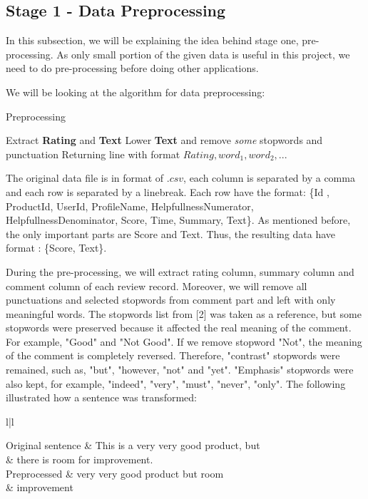 \subsection{Stage 1 - Data Preprocessing}
In this subsection, we will be explaining the idea behind stage one, pre-processing. As only small portion of the given data is useful in this project, we need to do pre-processing before doing other applications.

We will be looking at the algorithm for data preprocessing: 

\begin{algorithm}
\caption{Preprocessing}
\DontPrintSemicolon
{}

 {
 	Extract \textbf{Rating} and \textbf{Text}\;
 	Lower \textbf{Text} and remove \emph{some} stopwords and punctuation\;
 	Returning line with format \(Rating, word_{1}, word_{2}, ...\)\;
 }
\end{algorithm}


The original data file is in format of \(.csv\), each column is separated by a comma and each row is separated by a linebreak. Each row have the format: \{Id , ProductId, UserId, ProfileName, HelpfullnessNumerator, HelpfullnessDenominator, Score, Time, Summary, Text\}. As mentioned before, the only important parts are Score and Text. Thus, the resulting data have format : \{Score, Text\}. 

During the pre-processing, we will extract rating column, summary column and comment column of each review record. Moreover, we will remove all punctuations and selected stopwords from comment part and left with only meaningful words. The stopwords list from [2] was taken as a reference, but some stopwords were preserved because it affected the real meaning of the comment. For example, "Good" and "Not Good". If we remove stopword "Not", the meaning of the comment is completely reversed. Therefore, "contrast" stopwords were remained, such as, "but", "however, "not" and "yet". "Emphasis" stopwords were also kept, for example, "indeed", "very", "must", "never", "only". The following illustrated how a sentence was transformed:\\

\begin{tabular}{l|l}
	
  \midrule
  	 {Original sentence} &
  	This is a very very good product, but \\
  	& there is room for improvement.\\
  	\hline
	 {Preprocessed} &
	very very good product but room \\
	& improvement \\
  \bottomrule
\end{tabular}\\


